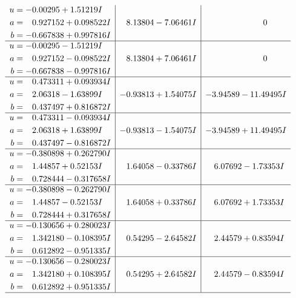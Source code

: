\documentclass[1p]{elsarticle_modified}
\theoremstyle{definition}
\begin{document}
$$\begin{array}{c|c|c}
\begin{aligned}
u &= -0.00295 + 1.51219 I \\
a &= \phantom{-}0.927152 + 0.098522 I \\
b &= -0.667838 + 0.997816 I\end{aligned}
 & \phantom{-}8.13804 - 7.06461 I & \phantom{-0.000000 } 0 \\ \hline\begin{aligned}
u &= -0.00295 - 1.51219 I \\
a &= \phantom{-}0.927152 - 0.098522 I \\
b &= -0.667838 - 0.997816 I\end{aligned}
 & \phantom{-}8.13804 + 7.06461 I & \phantom{-0.000000 } 0 \\ \hline\begin{aligned}
u &= \phantom{-}0.473311 + 0.093934 I \\
a &= \phantom{-}2.06318 - 1.63899 I \\
b &= \phantom{-}0.437497 + 0.816872 I\end{aligned}
 & -0.93813 + 1.54075 I & -3.94589 - 11.49495 I \\ \hline\begin{aligned}
u &= \phantom{-}0.473311 - 0.093934 I \\
a &= \phantom{-}2.06318 + 1.63899 I \\
b &= \phantom{-}0.437497 - 0.816872 I\end{aligned}
 & -0.93813 - 1.54075 I & -3.94589 + 11.49495 I \\ \hline\begin{aligned}
u &= -0.380898 + 0.262790 I \\
a &= \phantom{-}1.44857 + 0.52153 I \\
b &= \phantom{-}0.728444 - 0.317658 I\end{aligned}
 & \phantom{-}1.64058 - 0.33786 I & \phantom{-}6.07692 - 1.73353 I \\ \hline\begin{aligned}
u &= -0.380898 - 0.262790 I \\
a &= \phantom{-}1.44857 - 0.52153 I \\
b &= \phantom{-}0.728444 + 0.317658 I\end{aligned}
 & \phantom{-}1.64058 + 0.33786 I & \phantom{-}6.07692 + 1.73353 I \\ \hline\begin{aligned}
u &= -0.130656 + 0.280023 I \\
a &= \phantom{-}1.342180 - 0.108395 I \\
b &= \phantom{-}0.612892 - 0.951335 I\end{aligned}
 & \phantom{-}0.54295 - 2.64582 I & \phantom{-}2.44579 + 0.83594 I \\ \hline\begin{aligned}
u &= -0.130656 - 0.280023 I \\
a &= \phantom{-}1.342180 + 0.108395 I \\
b &= \phantom{-}0.612892 + 0.951335 I\end{aligned}
 & \phantom{-}0.54295 + 2.64582 I & \phantom{-}2.44579 - 0.83594 I\\
 \hline 
 \end{array}$$\newpage
\end{document}
